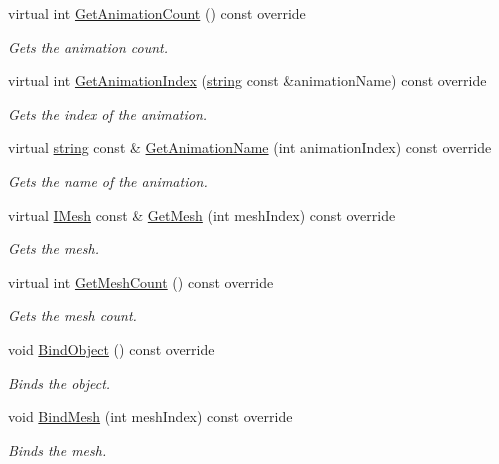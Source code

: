 \begin{DoxyCompactItemize}
virtual int \hyperlink{class_renderable_object_a563d3fa3d042391aaec87c50d941b22f}{Get\+Animation\+Count} () const  override
\begin{DoxyCompactList}\small\item\em Gets the animation count. \end{DoxyCompactList}\item 
virtual int \hyperlink{class_renderable_object_af5fdadfd9d27e4eaac17e2bb80629df0}{Get\+Animation\+Index} (\hyperlink{_types_8h_ad453f9f71ce1f9153fb748d6bb25e454}{string} const \&animation\+Name) const  override
\begin{DoxyCompactList}\small\item\em Gets the index of the animation. \end{DoxyCompactList}\item 
virtual \hyperlink{_types_8h_ad453f9f71ce1f9153fb748d6bb25e454}{string} const \& \hyperlink{class_renderable_object_a1635f30e2a39a33a2cbf1819c1fc0b56}{Get\+Animation\+Name} (int animation\+Index) const  override
\begin{DoxyCompactList}\small\item\em Gets the name of the animation. \end{DoxyCompactList}\item 
virtual \hyperlink{class_i_mesh}{I\+Mesh} const \& \hyperlink{class_renderable_object_acda89656ba51e82065b187545b84c3c1}{Get\+Mesh} (int mesh\+Index) const  override
\begin{DoxyCompactList}\small\item\em Gets the mesh. \end{DoxyCompactList}\item 
virtual int \hyperlink{class_renderable_object_a94f9b0b23548e7c48abfe2898b7dc678}{Get\+Mesh\+Count} () const  override
\begin{DoxyCompactList}\small\item\em Gets the mesh count. \end{DoxyCompactList}\item 
void \hyperlink{class_renderable_object_a2102e7d00fe32a573437b09f4f0bc2ba}{Bind\+Object} () const  override
\begin{DoxyCompactList}\small\item\em Binds the object. \end{DoxyCompactList}\item 
void \hyperlink{class_renderable_object_a17742c27c09c1b1bbd3509db1a80f836}{Bind\+Mesh} (int mesh\+Index) const  override
\begin{DoxyCompactList}\small\item\em Binds the mesh. \end{DoxyCompactList}\end{DoxyCompactItemize}
